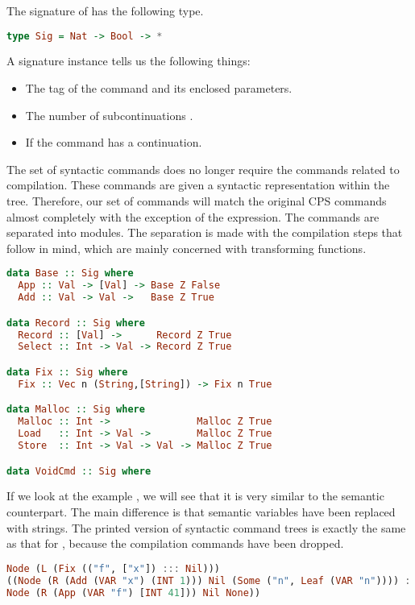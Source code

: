 The signature of  has the following type.

\begin{lstlisting}[language=Haskell]
type Sig = Nat -> Bool -> *
\end{lstlisting}

A signature instance  tells us the following things:

\begin{itemize}
\item The tag of the command and its enclosed parameters.
\item The number of subcontinuations .
\item If the command has a continuation.
\end{itemize}

The set of syntactic commands does no longer require the commands related to compilation. These commands are given a syntactic representation within the tree. Therefore, our set of commands will match the original CPS commands almost completely with the exception of the  expression. The commands are separated into modules. The separation is made with the compilation steps that follow in mind, which are mainly concerned with transforming functions.

\begin{lstlisting}[language=Haskell]
data Base :: Sig where
  App :: Val -> [Val] -> Base Z False
  Add :: Val -> Val ->   Base Z True 

data Record :: Sig where
  Record :: [Val] ->      Record Z True
  Select :: Int -> Val -> Record Z True

data Fix :: Sig where
  Fix :: Vec n (String,[String]) -> Fix n True

data Malloc :: Sig where
  Malloc :: Int ->               Malloc Z True
  Load   :: Int -> Val ->        Malloc Z True
  Store  :: Int -> Val -> Val -> Malloc Z True

data VoidCmd :: Sig where
\end{lstlisting}

If we look at the example , we will see that it is very similar to the semantic counterpart. The main difference is that semantic variables have been replaced with strings. The printed version of syntactic command trees is exactly the same as that for , because the compilation commands have been dropped.

\begin{lstlisting}[language=Haskell]
Node (L (Fix (("f", ["x"]) ::: Nil)))
((Node (R (Add (VAR "x") (INT 1))) Nil (Some ("n", Leaf (VAR "n")))) ::: Nil) (Some ("",
Node (R (App (VAR "f") [INT 41])) Nil None))
\end{lstlisting}


